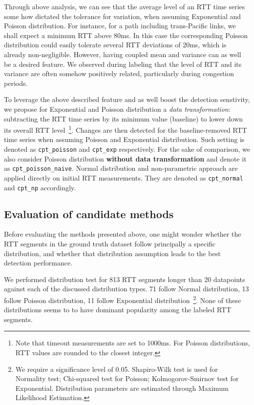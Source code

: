 Through above analysis, we can see that the average level of an RTT time series some how dictated the tolerance for variation, when assuming Exponential and Poisson distribution.
For instance, for a path including trans-Pacific links, we shall expect a minimum RTT above 80ms.
In this case the corresponding Poisson distribution could easily tolerate several RTT deviations of 20ms, which is already non-negligible.
However, having coupled mean and variance can as well be a desired feature. 
We observed during labeling that the level of RTT and its variance are often somehow positively related, particularly during congestion periods. 

To leverage the above described feature and as well boost the detection senstivity, we propose for Exponential and Poisson distribution a \textit{data transformation}: subtracting the RTT time series by its minimum value (baseline) to lower down its overall RTT level~\footnote{Note that timeout measurements are set to 1000ms. 
For Poisson distributions, RTT values are rounded to the closest integer.}. 
Changes are then detected for the baseline-removed RTT time series when assuming Poisson and Exponential distribution.
Such setting is denoted as \texttt{cpt\_poisson} and \texttt{cpt\_exp} respectively.
For the sake of comparison, we also consider Poisson distribution \textbf{without data transformation} and denote it as \texttt{cpt\_poisson\_naive}.
Normal distribution and non-parametric approach are applied directly on initial RTT measurements.
They are denoted as \texttt{cpt\_normal} and \texttt{cpt\_np} accordingly.

\subsection{Evaluation of candidate methods}
\label{sec:eval}

Before evaluating the methods presented above, one might wonder whether the RTT segments in the ground truth dataset follow principally a specific distribution, and whether that distribution assumption leads to the best detection performance.

We performed distribution test for 813 RTT segments longer than 20 datapoints against each of the discussed distribution types.
71 follow Normal distribution, 13 follow Poisson distribution, 11 follow Exponential distribution~\footnote{We require a significance level of 0.05. Shapiro-Wilk test is used for Normality test; %
Chi-squared test for Poisson; Kolmogorov-Smirnov test for Exponential. Distribution parameters are estimated through Maximum Likelihood Estimation.}. 
None of these distributions seems to to have dominant popularity among the labeled RTT segments.

